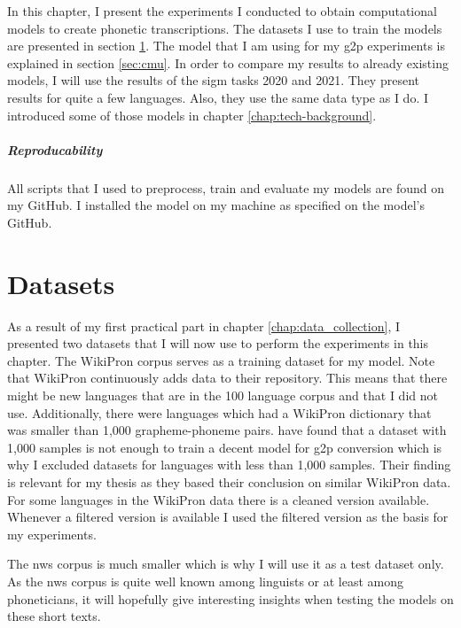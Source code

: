 
\label{chap:exp}
In this chapter, I present the experiments I conducted to obtain computational models to create phonetic transcriptions. The datasets I use to train the models are presented in section \ref{sec:dataset-models}. The model that I am using for my \ac{g2p} experiments is explained in section \ref{sec:cmu}. In order to compare my results to already existing models, I will use the results of the \ac{sigm} tasks 2020 and 2021. They present results for quite a few languages. Also, they use the same data type as I do. I introduced some of those models in chapter \ref{chap:tech-background}. 

\subparagraph{Reproducability}
All scripts that I used to preprocess, train and evaluate my models are found on my GitHub. I installed the model on my machine as specified on the model's GitHub. 

\section{Datasets}
\label{sec:dataset-models}
As a result of my first practical part in chapter \ref{chap:data_collection}, I presented two datasets that I will now use to perform the experiments in this chapter. The WikiPron corpus serves as a training dataset for my model. Note that WikiPron continuously adds data to their repository. This means that there might be new languages that are in the 100 language corpus and that I did not use. Additionally, there were languages which had a WikiPron dictionary that was smaller than 1,000 grapheme-phoneme pairs. \citet{Ashby-Bartley.2021} have found that a dataset with 1,000 samples is not enough to train a decent model for \ac{g2p} conversion which is why I excluded datasets for languages with less than 1,000 samples. Their finding is relevant for my thesis as they based their conclusion on similar WikiPron data. For some languages in the WikiPron data there is a cleaned version available. Whenever a filtered version is available I used the filtered version as the basis for my experiments.

The \ac{nws} corpus is much smaller which is why I will use it as a test dataset only. As the \ac{nws} corpus is quite well known among linguists or at least among phoneticians, it will hopefully give interesting insights when testing the models on these short texts. 

